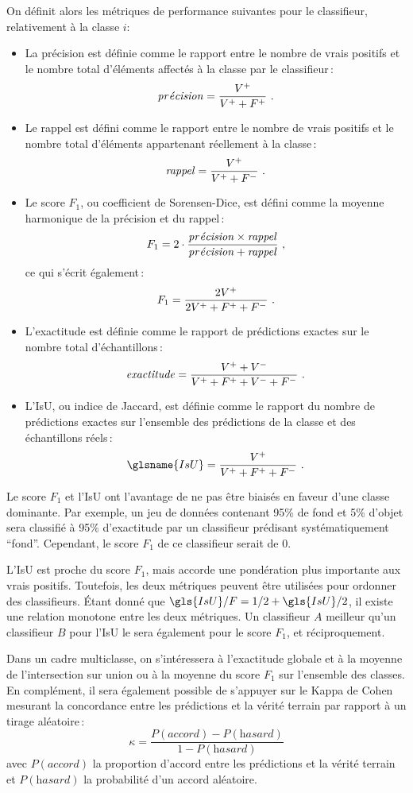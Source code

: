On définit alors les métriques de performance suivantes pour le classifieur, relativement à la classe $i$:
\begin{itemize}
	\item La précision est définie comme le rapport entre le nombre de vrais positifs et le nombre total d'éléments affectés à la classe par le classifieur\,:
  $$\mathit{pr\acute{e}cision} = \frac{V^+}{V^+ + F^+}~.$$
	\item Le rappel est défini comme le rapport entre le nombre de vrais positifs et le nombre total d'éléments appartenant réellement à la classe\,:
  $$\mathit{rappel} = \frac{V^+}{V^+ + F^-}~.$$
	\item Le score $F_1$, ou coefficient de Sorensen-Dice, est défini comme la moyenne harmonique de la précision et du rappel\,:
  $$F_1 = 2\cdot\frac{\mathit{pr\acute{e}cision} \times \mathit{rappel}}{\mathit{pr\acute{e}cision} + \mathit{rappel}}~,$$
  ce qui s'écrit également\,:
  $$F_1 = \frac{2 V^+}{2 V^+ + F^+ + F^-}~.$$
	\item L'exactitude est définie comme le rapport de prédictions exactes sur le nombre total d'échantillons\,:
  $$\mathit{exactitude} = \frac{V^+ + V^-}{V^+ + F^+ + V^- + F^-}~.$$
	\item L'\gls{IsU}, ou indice de Jaccard, est définie comme le rapport du nombre de prédictions exactes sur l'ensemble des prédictions de la classe et des échantillons réels\,:
  $$\glsname{IsU} = \frac{\tp}{\tp + \fp + \fn}~.$$
\end{itemize}

Le score $F_1$ et l'\gls{IsU} ont l'avantage de ne pas être biaisés en faveur d'une classe dominante. Par exemple, un jeu de données contenant 95\% de fond et 5\% d'objet sera classifié à 95\% d'exactitude par un classifieur prédisant systématiquement ``fond''. Cependant, le score $F_1$ de ce classifieur serait de $0$.

L'\gls{IsU} est proche du score $F_1$, mais accorde une pondération plus importante aux vrais positifs. Toutefois, les deux métriques peuvent être utilisées pour ordonner des classifieurs. Étant donné que $\gls{IsU}/F = 1/2 + \gls{IsU}/2$, il existe une relation monotone entre les deux métriques. Un classifieur $A$ meilleur qu'un classifieur $B$ pour l'\gls{IsU} le sera également pour le score $F_1$, et réciproquement.

Dans un cadre multiclasse, on s'intéressera à l'exactitude globale et à la moyenne de l'intersection sur union ou à la moyenne du score $F_1$ sur l'ensemble des classes. En complément, il sera également possible de s'appuyer sur le Kappa de Cohen mesurant la concordance entre les prédictions et la vérité terrain par rapport à un tirage aléatoire\,:
$$\kappa = \frac{P(\textit{accord}) - P(\textit{hasard})}{1 - P(\textit{hasard})}$$
avec $P(\textit{accord})$ la proportion d'accord entre les prédictions et la vérité terrain et $P(\textit{hasard})$ la probabilité d'un accord aléatoire.

